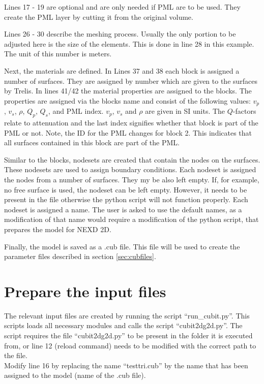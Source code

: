     	\medskip
    	Lines 17 - 19 are optional and are only needed if PML are to be used. They create the PML layer by cutting it from the original volume.
    	
    	\medskip
    	
    	\medskip
    	Lines 26 - 30 describe the meshing process. Usually the only portion to be adjusted here is the size of the elements. This is done in line 28 in this example. The unit of this number is meters.
    	
    	Next, the materials are defined. In Lines 37 and 38 each block is assigned a number of surfaces. They are assigned by number which are given to the surfaces by Trelis.
    	In lines 41/42 the material properties are assigned to the blocks. The properties are assigned via the blocks name and consist of the following values: $v_p$, $v_s$, $\rho$, $Q_p$, $Q_s$, and PML index. $v_p$, $v_s$ and $\rho$ are given in SI units. The $Q$-factors relate to attenuation and the last index signifies whether that block is part of the PML or not. Note, the ID for the PML changes for block 2. This indicates that all surfaces contained in this block are part of the PML.
    	
    	Similar to the blocks, nodesets are created that contain the nodes on the surfaces. These nodesets are used to assign boundary conditions. Each nodeset is assigned the nodes from a number of surfaces. They my be also left empty. If, for example, no free surface is used, the nodeset can be left empty. However, it needs to be present in the file otherwise the python script  will not function properly. Each nodeset is assigned a name. The user is asked to use the default names, as a modification of that name would require a modification of the python script, that prepares the model for NEXD 2D.
    	  
    	Finally, the model is saved as a .cub file. This file will be used to create the parameter files described in section \ref{sec:cubfiles}.
    	
    \section{Prepare the input files}
    \label{sec:prepinput}
    	The relevant input files are created by running the script ``run\_cubit.py''. This scripts loads all necessary modules and calls the script ``cubit2dg2d.py''. The script requires the file ``cubit2dg2d.py'' to be present in the folder it is executed from, or line 12 (reload command) needs to be modified with the correct path to the file. 
    	 \\
    	Modify line 16 by replacing the name ``testtri.cub'' by the name that has been assigned to the model (name of the .cub file). 
